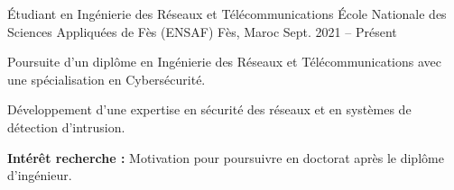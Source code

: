 
\begin{cventries}

    \cventry
    {Étudiant en Ingénierie des Réseaux et Télécommunications}
    {École Nationale des Sciences Appliquées de Fès (ENSAF)} %
    {Fès, Maroc} %
    {Sept. 2021 – Présent} %
    {
        \begin{cvitems} %
            \item {Poursuite d'un diplôme en Ingénierie des Réseaux et Télécommunications avec une spécialisation en Cybersécurité.}
            \item {Développement d'une expertise en sécurité des réseaux et en systèmes de détection d'intrusion.}
            \item {\textbf{Intérêt recherche :} Motivation pour poursuivre en doctorat après le diplôme d'ingénieur.}
        \end{cvitems}
    }

\end{cventries}